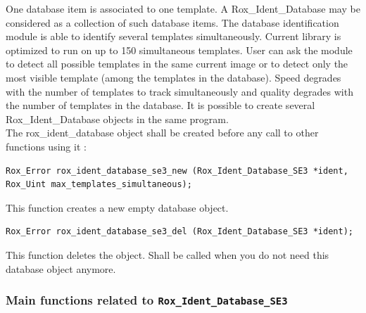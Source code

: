 \noindent One database item is associated to one template. A Rox\_Ident\_Database may be considered as a collection of such database items. The database identification module is able to identify several templates simultaneously. Current library is optimized to run on up to 150 simultaneous templates. User can ask the module to detect all possible templates in the same current image or to detect only the most visible template (among the templates in the database). Speed degrades with the number of templates to track simultaneously and quality degrades with the number of templates in the database. It is possible to create several Rox\_Ident\_Database objects in the same program.\\

\noindent The rox\_ident\_database object shall be created before any call to other functions using it :

\begin{lstlisting}
Rox_Error rox_ident_database_se3_new (Rox_Ident_Database_SE3 *ident, Rox_Uint max_templates_simultaneous);
\end{lstlisting}

\noindent This function creates a new empty database object.

\begin{lstlisting}
Rox_Error rox_ident_database_se3_del (Rox_Ident_Database_SE3 *ident);
\end{lstlisting}

This function deletes the object. Shall be called when you do not need this database object anymore.

\subsubsection{Main functions related to {\tt Rox\_Ident\_Database\_SE3}}



